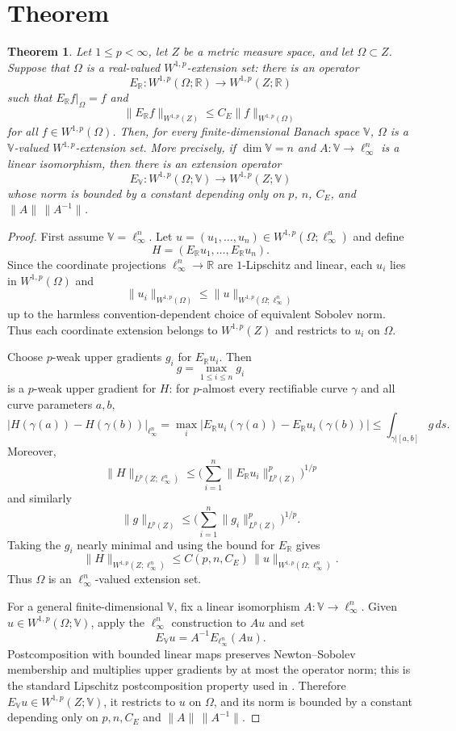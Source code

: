 \documentclass[11pt]{article}
\newtheorem{theorem}{Theorem}
\newcommand{\R}{\mathbb{R}}
\newcommand{\V}{\mathbb{V}}
\newcommand{\Om}{\Omega}
\begin{document}
\section*{Theorem}

\begin{theorem}
Let $1\le p<\infty$, let $Z$ be a metric measure space, and let
$\Om\subset Z$. Suppose that $\Om$ is a real-valued $W^{1,p}$-extension set:
there is an operator
\[
  E_{\R}: W^{1,p}(\Om;\R)\to W^{1,p}(Z;\R)
\]
such that $E_{\R}f|_{\Om}=f$ and
\[
  \|E_{\R}f\|_{W^{1,p}(Z)}
  \le C_E\|f\|_{W^{1,p}(\Om)}
\]
for all $f\in W^{1,p}(\Om)$.
Then, for every finite-dimensional Banach space $\V$, $\Om$ is a
$\V$-valued $W^{1,p}$-extension set. More precisely, if
$\dim\V=n$ and $A:\V\to \ell_\infty^n$ is a linear isomorphism, then there is
an extension operator
\[
  E_{\V}:W^{1,p}(\Om;\V)\to W^{1,p}(Z;\V)
\]
whose norm is bounded by a constant depending only on $p$, $n$, $C_E$, and
$\|A\|\,\|A^{-1}\|$.
\end{theorem}

\begin{proof}
First assume $\V=\ell_\infty^n$. Let
$u=(u_1,\ldots,u_n)\in W^{1,p}(\Om;\ell_\infty^n)$ and define
\[
  H=(E_{\R}u_1,\ldots,E_{\R}u_n).
\]
Since the coordinate projections $\ell_\infty^n\to\R$ are $1$-Lipschitz and
linear, each $u_i$ lies in $W^{1,p}(\Om)$ and
\[
  \|u_i\|_{W^{1,p}(\Om)}\le \|u\|_{W^{1,p}(\Om;\ell_\infty^n)}
\]
up to the harmless convention-dependent choice of equivalent Sobolev norm.
Thus each coordinate extension belongs to $W^{1,p}(Z)$ and restricts to
$u_i$ on $\Om$.

Choose $p$-weak upper gradients $g_i$ for $E_{\R}u_i$. Then
\[
  g=\max_{1\le i\le n} g_i
\]
is a $p$-weak upper gradient for $H$: for $p$-almost every rectifiable curve
$\gamma$ and all curve parameters $a,b$,
\[
  |H(\gamma(a))-H(\gamma(b))|_{\ell_\infty^n}
  =
  \max_i |E_{\R}u_i(\gamma(a))-E_{\R}u_i(\gamma(b))|
  \le
  \int_{\gamma|[a,b]} g\,ds .
\]
Moreover,
\[
  \|H\|_{L^p(Z;\ell_\infty^n)}
  \le
  \Big(\sum_{i=1}^n \|E_{\R}u_i\|_{L^p(Z)}^p\Big)^{1/p}
\]
and similarly
\[
  \|g\|_{L^p(Z)}
  \le
  \Big(\sum_{i=1}^n \|g_i\|_{L^p(Z)}^p\Big)^{1/p}.
\]
Taking the $g_i$ nearly minimal and using the bound for $E_{\R}$ gives
\[
  \|H\|_{W^{1,p}(Z;\ell_\infty^n)}
  \le C(p,n,C_E)\,\|u\|_{W^{1,p}(\Om;\ell_\infty^n)} .
\]
Thus $\Om$ is an $\ell_\infty^n$-valued extension set.

For a general finite-dimensional $\V$, fix a linear isomorphism
$A:\V\to\ell_\infty^n$. Given $u\in W^{1,p}(\Om;\V)$, apply the
$\ell_\infty^n$ construction to $Au$ and set
\[
  E_{\V}u=A^{-1}E_{\ell_\infty^n}(Au).
\]
Postcomposition with bounded linear maps preserves Newton--Sobolev membership
and multiplies upper gradients by at most the operator norm; this is the
standard Lipschitz postcomposition property used in \cite{GIZ}. Therefore
$E_{\V}u\in W^{1,p}(Z;\V)$, it restricts to $u$ on $\Om$, and its norm is
bounded by a constant depending only on $p,n,C_E$ and
$\|A\|\,\|A^{-1}\|$.
\end{proof}
\end{document}
